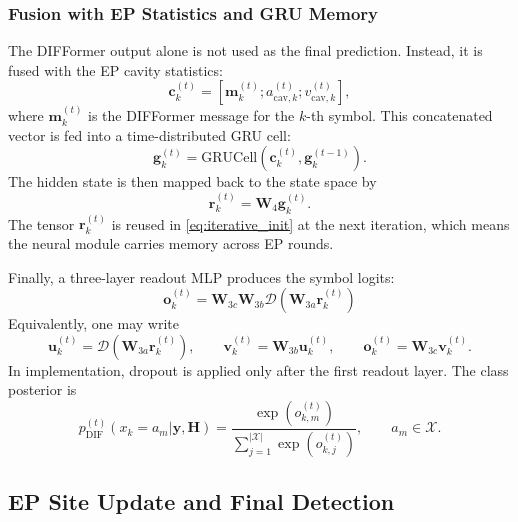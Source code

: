\documentclass[conference]{IEEEtran}
\begin{document}
\subsubsection{Fusion with EP Statistics and GRU Memory}

The DIFFormer output alone is not used as the final prediction. Instead, it is fused with the EP cavity statistics:
\begin{equation}
\mathbf{c}_k^{(t)}
=
\left[
\mathbf{m}_k^{(t)};
a_{\mathrm{cav},k}^{(t)};
v_{\mathrm{cav},k}^{(t)}
\right],
\label{eq:gru_input}
\end{equation}
where $\mathbf{m}_k^{(t)}$ is the DIFFormer message for the $k$-th symbol. This concatenated vector is fed into a time-distributed GRU cell:
\begin{equation}
\mathbf{g}_k^{(t)}
=
\mathrm{GRUCell}
\left(
\mathbf{c}_k^{(t)},
\mathbf{g}_k^{(t-1)}
\right).
\label{eq:gru_update}
\end{equation}
The hidden state is then mapped back to the state space by
\begin{equation}
\mathbf{r}_k^{(t)}=\mathbf{W}_{4}\mathbf{g}_k^{(t)}.
\label{eq:read_gru}
\end{equation}
The tensor $\mathbf{r}_k^{(t)}$ is reused in \eqref{eq:iterative_init} at the next iteration, which means the neural module carries memory across EP rounds.

Finally, a three-layer readout MLP produces the symbol logits:
\begin{equation}
\mathbf{o}_k^{(t)}
=
\mathbf{W}_{3c}
\mathbf{W}_{3b}
\mathcal{D}\!\left(
\mathbf{W}_{3a}
\mathbf{r}_k^{(t)}
\right)
\end{equation}
Equivalently, one may write
\begin{equation}
\mathbf{u}_k^{(t)}=\mathcal{D}\!\left(\mathbf{W}_{3a}\mathbf{r}_k^{(t)}\right),\qquad
\mathbf{v}_k^{(t)}=\mathbf{W}_{3b}\mathbf{u}_k^{(t)},\qquad
\mathbf{o}_k^{(t)}=\mathbf{W}_{3c}\mathbf{v}_k^{(t)}.
\label{eq:readout}
\end{equation}
In implementation, dropout is applied only after the first readout layer. The class posterior is
\begin{equation}
p_{\mathrm{DIF}}^{(t)}(x_k=a_m|\mathbf{y},\mathbf{H})
=
\frac{\exp(o_{k,m}^{(t)})}
{\sum_{j=1}^{|\mathcal{X}|}\exp(o_{k,j}^{(t)})},
\qquad a_m\in\mathcal{X}.
\label{eq:softmax}
\end{equation}

\subsection{EP Site Update and Final Detection}
\end{document}
